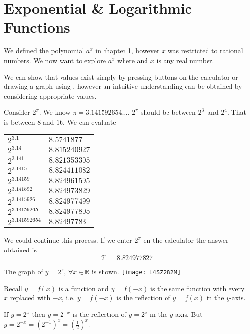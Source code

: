 \chapter[Exponential Functions]{Exponential \& Logarithmic \\Functions}
We defined the polynomial $a^{x}$ in chapter 1, however $x$ was restricted to rational numbers. We now want to explore $a^{x}$ where and $x$ is any real number. 

We can show that values exist simply by pressing buttons on the calculator or drawing a graph using \desmos, however an intuitive understanding can be obtained by considering appropriate values. 

Consider $2^{\pi }$. We know $\pi  =3.141592654 \ldots $. $2^{\pi }$ should be between $2^{3}$\ and $2^{4}$. That is between $8$ and $16$. We can evaluate 

\qquad \qquad \qquad \qquad \qquad \qquad \qquad \qquad
\begin{tabular}[c]{ll}$2^{3.1}$  & $8.5741877$  \\
	$2^{3.14}$  & $8.815240927$  \\
	$2^{3.141}$  & $8.821353305$  \\
	$2^{3.1415}$  & $8.824411082$  \\
	$2^{3.14159}$  & $8.824961595$  \\
	$2^{3.141592}$  & $8.824973829$  \\
	$2^{3.1415926}$  & $8.824977499$  \\
	$2^{3.14159265}$  & $8.824977805$  \\
	$2^{3.141592654}$  & $8.82497783$
\end{tabular}

We could continue this process. If we enter $2^{\pi }$ on the calculator the answer obtained is
\begin{equation*}2^{\pi } =8.824977827
\end{equation*}

The graph of $y =2^{x}$, $ \forall x \in \mathbb{R}$ is shown. 
\texttt{[image: L4SZ282M]}

Recall $y =f (x)$ is a function and $y =f ( -x)$ is the same function with every $x$ replaced with $ -x$, i.e. $y =f ( -x)$ is the reflection of $y =f (x)$ in the $y$-axis. 

If $y =2^{x}$ then $y =2^{ -x}$ is the reflection of $y =2^{x}$ in the $y$-axis. But $y =2^{ -x} =\left (2^{ -1}\right )^{x} =\genfrac{(}{)}{}{}{1}{2}^{x}$. 

